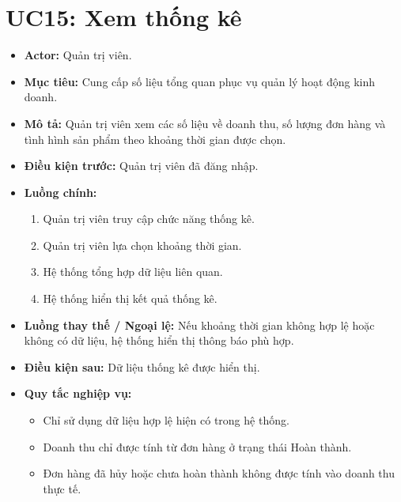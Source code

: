 \section{UC15: Xem thống kê}
\begin{itemize}
    \item \textbf{Actor:} Quản trị viên.
    \item \textbf{Mục tiêu:} Cung cấp số liệu tổng quan phục vụ quản lý hoạt động kinh doanh.
    \item \textbf{Mô tả:} Quản trị viên xem các số liệu về doanh thu, số lượng đơn hàng và tình hình sản phẩm theo khoảng thời gian được chọn.
    \item \textbf{Điều kiện trước:} Quản trị viên đã đăng nhập.
    \item \textbf{Luồng chính:}
    \begin{enumerate}
        \item Quản trị viên truy cập chức năng thống kê.
        \item Quản trị viên lựa chọn khoảng thời gian.
        \item Hệ thống tổng hợp dữ liệu liên quan.
        \item Hệ thống hiển thị kết quả thống kê.
    \end{enumerate}
    \item \textbf{Luồng thay thế / Ngoại lệ:} Nếu khoảng thời gian không hợp lệ hoặc không có dữ liệu, hệ thống hiển thị thông báo phù hợp.
    \item \textbf{Điều kiện sau:} Dữ liệu thống kê được hiển thị.
    \item \textbf{Quy tắc nghiệp vụ:}
    \begin{itemize}
        \item Chỉ sử dụng dữ liệu hợp lệ hiện có trong hệ thống.
        \item Doanh thu chỉ được tính từ đơn hàng ở trạng thái Hoàn thành.
        \item Đơn hàng đã hủy hoặc chưa hoàn thành không được tính vào doanh thu thực tế.
    \end{itemize}
\end{itemize}

